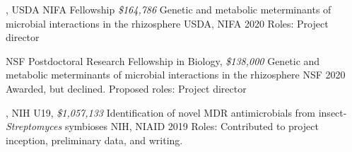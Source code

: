 

\begin{cventries}

\cventry
{\textbf{\textit{}}, USDA NIFA Fellowship \textit{\$164,786}}
{Genetic and metabolic meterminants of microbial interactions in the rhizosphere}
{USDA, NIFA}
{2020}
{Roles: Project director}

\cventry
{NSF Postdoctoral Research Fellowship in Biology, \textit{\$138,000}}
{Genetic and metabolic meterminants of microbial interactions in the rhizosphere}
{NSF}
{2020}
{Awarded, but declined. Proposed roles: Project director}

\cventry
{\textbf{\textit{}}, NIH U19, \textit{\$1,057,133}}
{Identification of novel MDR antimicrobials from insect-\textit{Streptomyces} symbioses}
{NIH, NIAID}
{2019}
{Roles: Contributed to project inception, preliminary data, and writing.}

\end{cventries}


